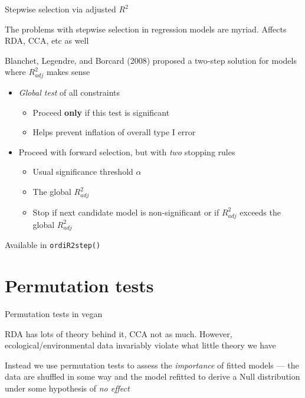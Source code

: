 \documentclass[10pt,ignorenonframetext,compress, aspectratio=169]{beamer}
\begin{document}
\begin{frame}{Stepwise selection via adjusted \(R^2\)}

The problems with stepwise selection in regression models are myriad.
Affects RDA, CCA, etc as well

Blanchet, Legendre, and Borcard (2008) proposed a two-step solution for
models where \(R^2_{adj}\) makes sense

\begin{itemize}
\itemsep1pt\parskip0pt
\item
  \emph{Global test} of all constraints

  \begin{itemize}
  \itemsep1pt\parskip0pt
  \item
    Proceed \textbf{only} if this test is significant
  \item
    Helps prevent inflation of overall type I error
  \end{itemize}
\item
  Proceed with forward selection, but with \emph{two} stopping rules

  \begin{itemize}
  \itemsep1pt\parskip0pt
  \item
    Usual significance threshold \(\alpha\)
  \item
    The global \(R^2_{adj}\)
  \item
    Stop if next candidate model is non-significant or if \(R^2_{adj}\)
    exceeds the global \(R^2_{adj}\)
  \end{itemize}
\end{itemize}

Available in \texttt{ordiR2step()}

\end{frame}

\section{Permutation tests}\label{permutation-tests}

\begin{frame}{Permutation tests in vegan}

RDA has lots of theory behind it, CCA not as much. However,
ecological/environmental data invariably violate what little theory we
have

Instead we use permutation tests to assess the \emph{importance} of
fitted models --- the data are shuffled in some way and the model
refitted to derive a Null distribution under some hypothesis of \emph{no
effect}

\end{frame}
\end{document}
